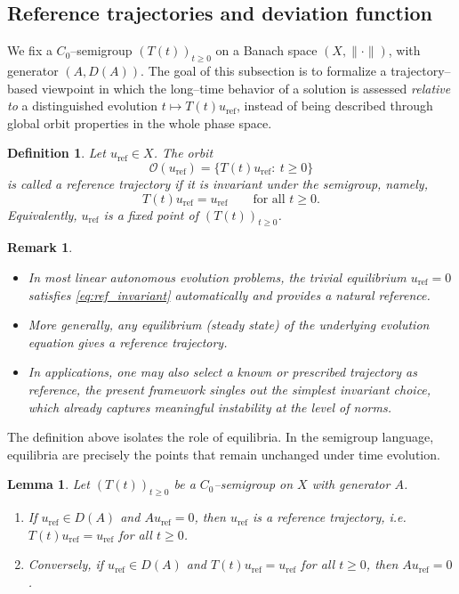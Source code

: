 \documentclass[12pt]{article}
\newtheorem{lemma}[theorem]{Lemma}
\newtheorem{definition}[theorem]{Definition}
\newtheorem{remark}[theorem]{Remark}
\begin{document}
\subsection{Reference trajectories and deviation function}

We fix a $C_0$--semigroup $(T(t))_{t\ge 0}$ on a Banach space $(X,\|\cdot\|)$, with generator $(A,D(A))$. The goal of this subsection is to formalize a trajectory--based viewpoint in which the long--time behavior of a solution is assessed \emph{relative to} a distinguished evolution $t\mapsto T(t)u_{\mathrm{ref}}$, instead of being described through global orbit properties in the whole phase space.

\begin{definition}\label{def:reftraj}
Let $u_{\mathrm{ref}}\in X$. The orbit
\[
\mathcal{O}(u_{\mathrm{ref}})=\{T(t)u_{\mathrm{ref}}:\ t\ge 0\}
\]
is called a \emph{reference trajectory} if it is invariant under the semigroup, namely,
\begin{equation}\label{eq:ref_invariant}
T(t)u_{\mathrm{ref}}=u_{\mathrm{ref}}\qquad \text{for all }t\ge 0.
\end{equation}
Equivalently, $u_{\mathrm{ref}}$ is a fixed point of $(T(t))_{t\ge 0}$.
\end{definition}

\begin{remark}\label{rem:reftraj_examples}
\begin{itemize}
\item In most linear autonomous evolution problems, the trivial equilibrium $u_{\mathrm{ref}}=0$ satisfies \eqref{eq:ref_invariant} automatically and provides a natural reference.
\item More generally, any equilibrium (steady state) of the underlying evolution equation gives a reference trajectory.
\item In applications, one may also select a \emph{known} or \emph{prescribed} trajectory as reference, the present framework singles out the simplest invariant choice, which already captures meaningful instability at the level of norms.
\end{itemize}
\end{remark}

The definition above isolates the role of equilibria. In the semigroup language, equilibria are precisely the points that remain unchanged under time evolution.

\begin{lemma}\label{lem:equilibrium_fixedpoint}
Let $(T(t))_{t\ge 0}$ be a $C_0$--semigroup on $X$ with generator $A$.
\begin{enumerate}
\item If $u_{\mathrm{ref}}\in D(A)$ and $Au_{\mathrm{ref}}=0$, then $u_{\mathrm{ref}}$ is a reference trajectory, i.e.\ $T(t)u_{\mathrm{ref}}=u_{\mathrm{ref}}$ for all $t\ge 0$.
\item Conversely, if $u_{\mathrm{ref}}\in D(A)$ and $T(t)u_{\mathrm{ref}}=u_{\mathrm{ref}}$ for all $t\ge 0$, then $Au_{\mathrm{ref}}=0$.
\end{enumerate}
\end{lemma}
\end{document}
